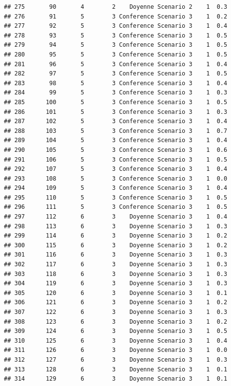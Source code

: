 \documentclass[
]{article}
\begin{document}
\begin{verbatim}
## 275       90       4        2    Doyenne Scenario 2    1  0.3
## 276       91       5        3 Conference Scenario 3    1  0.2
## 277       92       5        3 Conference Scenario 3    1  0.4
## 278       93       5        3 Conference Scenario 3    1  0.5
## 279       94       5        3 Conference Scenario 3    1  0.5
## 280       95       5        3 Conference Scenario 3    1  0.5
## 281       96       5        3 Conference Scenario 3    1  0.4
## 282       97       5        3 Conference Scenario 3    1  0.5
## 283       98       5        3 Conference Scenario 3    1  0.4
## 284       99       5        3 Conference Scenario 3    1  0.3
## 285      100       5        3 Conference Scenario 3    1  0.5
## 286      101       5        3 Conference Scenario 3    1  0.3
## 287      102       5        3 Conference Scenario 3    1  0.4
## 288      103       5        3 Conference Scenario 3    1  0.7
## 289      104       5        3 Conference Scenario 3    1  0.4
## 290      105       5        3 Conference Scenario 3    1  0.6
## 291      106       5        3 Conference Scenario 3    1  0.5
## 292      107       5        3 Conference Scenario 3    1  0.4
## 293      108       5        3 Conference Scenario 3    1  0.0
## 294      109       5        3 Conference Scenario 3    1  0.4
## 295      110       5        3 Conference Scenario 3    1  0.5
## 296      111       5        3 Conference Scenario 3    1  0.5
## 297      112       6        3    Doyenne Scenario 3    1  0.4
## 298      113       6        3    Doyenne Scenario 3    1  0.3
## 299      114       6        3    Doyenne Scenario 3    1  0.2
## 300      115       6        3    Doyenne Scenario 3    1  0.2
## 301      116       6        3    Doyenne Scenario 3    1  0.3
## 302      117       6        3    Doyenne Scenario 3    1  0.3
## 303      118       6        3    Doyenne Scenario 3    1  0.3
## 304      119       6        3    Doyenne Scenario 3    1  0.3
## 305      120       6        3    Doyenne Scenario 3    1  0.1
## 306      121       6        3    Doyenne Scenario 3    1  0.2
## 307      122       6        3    Doyenne Scenario 3    1  0.3
## 308      123       6        3    Doyenne Scenario 3    1  0.2
## 309      124       6        3    Doyenne Scenario 3    1  0.5
## 310      125       6        3    Doyenne Scenario 3    1  0.4
## 311      126       6        3    Doyenne Scenario 3    1  0.0
## 312      127       6        3    Doyenne Scenario 3    1  0.3
## 313      128       6        3    Doyenne Scenario 3    1  0.1
## 314      129       6        3    Doyenne Scenario 3    1  0.1

\end{verbatim}
\end{document}
